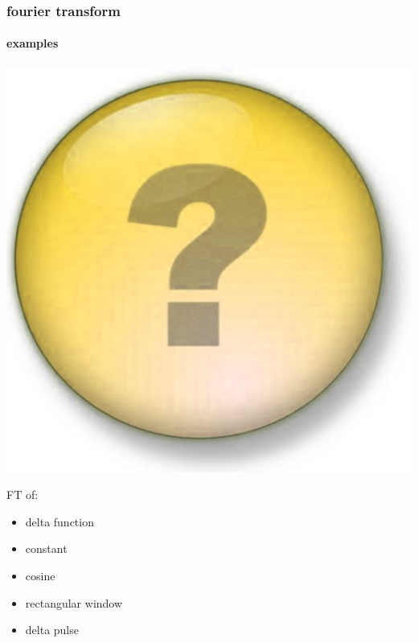 	\begin{frame}\frametitle{fourier transform}\framesubtitle{examples}
			\begin{flushright}
				 \includegraphics[scale=.08]{Graph/question-mark}
			\end{flushright}
			\vspace{-3mm}
			FT of:
			\begin{itemize}
				\item	delta function
				\item	constant
				\item	cosine
				\item	rectangular window
				\item	delta pulse
			\end{itemize}
	\end{frame}	

